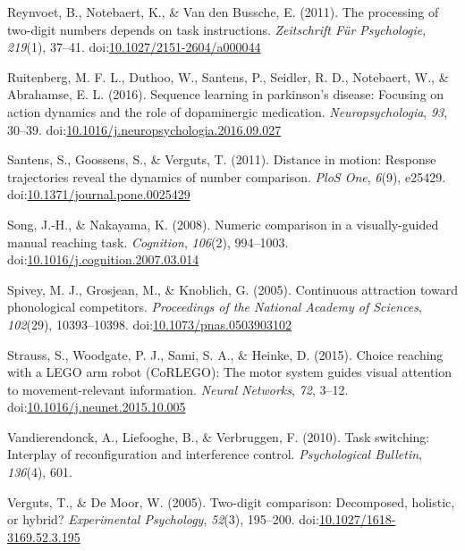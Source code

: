 \documentclass[english,man]{apa6}
\theoremstyle{definition}
\theoremstyle{definition}
\theoremstyle{definition}
\theoremstyle{remark}
\begin{document}
\hypertarget{ref-reynvoet2011}{}
Reynvoet, B., Notebaert, K., \& Van den Bussche, E. (2011). The
processing of two-digit numbers depends on task instructions.
\emph{Zeitschrift Für Psychologie}, \emph{219}(1), 37--41.
doi:\href{https://doi.org/10.1027/2151-2604/a000044}{10.1027/2151-2604/a000044}

\hypertarget{ref-ruitenberg2016}{}
Ruitenberg, M. F. L., Duthoo, W., Santens, P., Seidler, R. D.,
Notebaert, W., \& Abrahamse, E. L. (2016). Sequence learning in
parkinson's disease: Focusing on action dynamics and the role of
dopaminergic medication. \emph{Neuropsychologia}, \emph{93}, 30--39.
doi:\href{https://doi.org/10.1016/j.neuropsychologia.2016.09.027}{10.1016/j.neuropsychologia.2016.09.027}

\hypertarget{ref-santens2011}{}
Santens, S., Goossens, S., \& Verguts, T. (2011). Distance in motion:
Response trajectories reveal the dynamics of number comparison.
\emph{PloS One}, \emph{6}(9), e25429.
doi:\href{https://doi.org/10.1371/journal.pone.0025429}{10.1371/journal.pone.0025429}

\hypertarget{ref-songNakayama2008}{}
Song, J.-H., \& Nakayama, K. (2008). Numeric comparison in a
visually-guided manual reaching task. \emph{Cognition}, \emph{106}(2),
994--1003.
doi:\href{https://doi.org/10.1016/j.cognition.2007.03.014}{10.1016/j.cognition.2007.03.014}

\hypertarget{ref-spivey2005}{}
Spivey, M. J., Grosjean, M., \& Knoblich, G. (2005). Continuous
attraction toward phonological competitors. \emph{Proceedings of the
National Academy of Sciences}, \emph{102}(29), 10393--10398.
doi:\href{https://doi.org/10.1073/pnas.0503903102}{10.1073/pnas.0503903102}

\hypertarget{ref-strauss2015}{}
Strauss, S., Woodgate, P. J., Sami, S. A., \& Heinke, D. (2015). Choice
reaching with a LEGO arm robot (CoRLEGO): The motor system guides visual
attention to movement-relevant information. \emph{Neural Networks},
\emph{72}, 3--12.
doi:\href{https://doi.org/10.1016/j.neunet.2015.10.005}{10.1016/j.neunet.2015.10.005}

\hypertarget{ref-vandierendonck2010}{}
Vandierendonck, A., Liefooghe, B., \& Verbruggen, F. (2010). Task
switching: Interplay of reconfiguration and interference control.
\emph{Psychological Bulletin}, \emph{136}(4), 601.

\hypertarget{ref-verguts2005}{}
Verguts, T., \& De Moor, W. (2005). Two-digit comparison: Decomposed,
holistic, or hybrid? \emph{Experimental Psychology}, \emph{52}(3),
195--200.
doi:\href{https://doi.org/10.1027/1618-3169.52.3.195}{10.1027/1618-3169.52.3.195}
\end{document}
